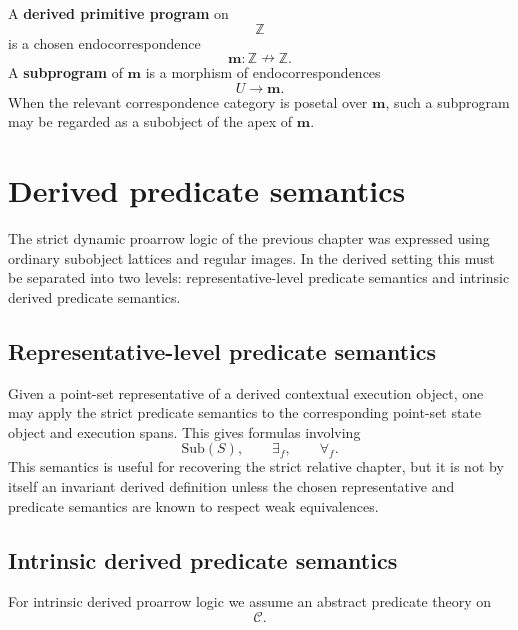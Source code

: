 \begin{definition}
\label{def:derived-primitive-program-subprogram}
A \textbf{derived primitive program} on
\[
\mathbb Z
\]
is a chosen endocorrespondence
\[
\mathbf m:\mathbb Z\nrightarrow\mathbb Z.
\]
A \textbf{subprogram} of \(\mathbf m\) is a morphism of endocorrespondences
\[
U\to\mathbf m.
\]
When the relevant correspondence category is posetal over \(\mathbf m\), such
a subprogram may be regarded as a subobject of the apex of \(\mathbf m\).
\end{definition}

\section{Derived predicate semantics}
\label{sec:derived-predicate-semantics}

The strict dynamic proarrow logic of the previous chapter was expressed using
ordinary subobject lattices and regular images. In the derived setting this
must be separated into two levels: representative-level predicate semantics
and intrinsic derived predicate semantics.

\subsection{Representative-level predicate semantics}
\label{subsec:representative-level-predicate-semantics}

Given a point-set representative of a derived contextual execution object,
one may apply the strict predicate semantics to the corresponding point-set
state object and execution spans. This gives formulas involving
\[
\mathrm{Sub}(S),
\qquad
\exists_f,
\qquad
\forall_f.
\]
This semantics is useful for recovering the strict relative chapter, but it is
not by itself an invariant derived definition unless the chosen representative
and predicate semantics are known to respect weak equivalences.

\subsection{Intrinsic derived predicate semantics}
\label{subsec:intrinsic-derived-predicate-semantics}

For intrinsic derived proarrow logic we assume an abstract predicate theory on
\[
\mathcal C.
\]

